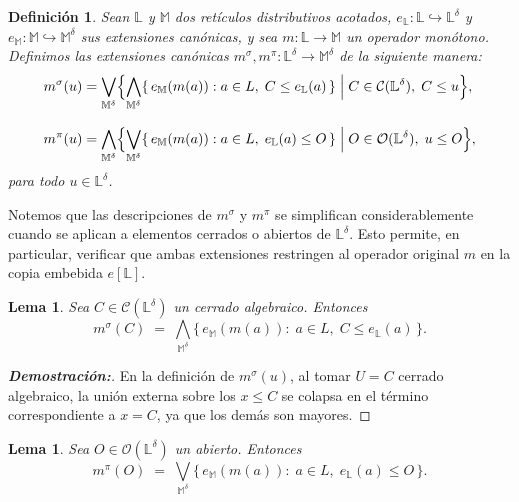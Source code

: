 \documentclass[12pt]{book}
\newtheorem{lemma}[theorem]{Lema}
\newtheorem{definition}[theorem]{Definición}
\begin{document}
\begin{definition}
Sean $\mathbb{L}$ y $\mathbb{M}$ dos retículos distributivos acotados, 
$e_\mathbb{L}\colon\mathbb{L}\hookrightarrow\mathbb{L}^\delta$ y 
$e_\mathbb{M}\colon\mathbb{M}\hookrightarrow\mathbb{M}^\delta$ sus extensiones canónicas, 
y sea $m\colon \mathbb{L}\to\mathbb{M}$ un operador monótono.  
Definimos las extensiones \emph{canónicas} $m^{\sigma},m^{\pi}\colon 
\mathbb{L}^\delta\to\mathbb{M}^\delta$ de la siguiente manera:
\begin{align*}
  m^{\sigma}(u)
  &=\bigvee_{\mathbb{M}^\delta}
     \Bigl\{
        \bigwedge_{\mathbb{M}^\delta}
        \{\, e_\mathbb{M}(m(a)) : a\in L,\; C\le e_\mathbb{L}(a)\,\}
      \;\Big|\;
        C\in\mathcal{C}(\mathbb{L}^\delta),\; C\le u
     \Bigr\},\\[3mm]
  m^{\pi}(u)
  &=\bigwedge_{\mathbb{M}^\delta}
     \Bigl\{
        \bigvee_{\mathbb{M}^\delta}
        \{\, e_\mathbb{M}(m(a)) : a\in L,\; e_\mathbb{L}(a)\le O\,\}
      \;\Big|\;
        O\in\mathcal{O}(\mathbb{L}^\delta),\; u\le O
     \Bigr\},
\end{align*}
para todo $u\in\mathbb{L}^\delta$.
\end{definition}
Notemos que las descripciones de $m^\sigma$ y $m^\pi$ se simplifican
considerablemente cuando se aplican a elementos cerrados o abiertos de
$\mathbb L^\delta$. Esto permite, en particular, verificar que ambas extensiones
restringen al operador original $m$ en la copia embebida $e[\mathbb L]$.
\begin{lemma}\label{lem:lambda-en-cerrado-general}
Sea $C\in\mathcal{C}(\mathbb{L}^\delta)$ un cerrado algebraico. Entonces
\[
  m^{\sigma}(C)
  \;=\;
  \bigwedge_{\mathbb{M}^\delta}\{\,e_\mathbb{M}(m(a)):\;a\in L,\; C\le e_\mathbb{L}(a)\,\}.
\]
\end{lemma}

\begin{proof}[\textbf{Demostración:}]
En la definición de $m^\sigma(u)$, al tomar $U=C$ cerrado algebraico, la unión externa sobre los
$x\le C$ se colapsa en el término correspondiente a $x=C$, ya que los demás son mayores.
\end{proof}

\begin{lemma}\label{lem:pi-en-abierto-general}
Sea $O\in\mathcal{O}(\mathbb{L}^\delta)$ un abierto. Entonces
\[
  m^{\pi}(O)
  \;=\;
  \bigvee_{\mathbb{M}^\delta}\{\,e_\mathbb{M}(m(a)):\;a\in L,\; e_\mathbb{L}(a)\le O\,\}.
\]
\end{lemma}
\end{document}
